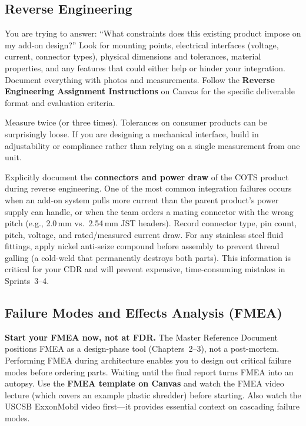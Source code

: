 \subsection{Reverse Engineering}

\begin{faqbox}
You are trying to answer: ``What constraints does this existing product impose on my add-on design?'' Look for mounting points, electrical interfaces (voltage, current, connector types), physical dimensions and tolerances, material properties, and any features that could either help or hinder your integration. Document everything with photos and measurements. Follow the \textbf{Reverse Engineering Assignment Instructions} on Canvas for the specific deliverable format and evaluation criteria.
\end{faqbox}

\begin{protip}
Measure twice (or three times). Tolerances on consumer products can be surprisingly loose. If you are designing a mechanical interface, build in adjustability or compliance rather than relying on a single measurement from one unit.
\end{protip}

\begin{warnbox}
Explicitly document the \textbf{connectors and power draw} of the COTS product during reverse engineering. One of the most common integration failures occurs when an add-on system pulls more current than the parent product's power supply can handle, or when the team orders a mating connector with the wrong pitch (e.g., 2.0\,mm vs.\ 2.54\,mm JST headers). Record connector type, pin count, pitch, voltage, and rated/measured current draw. For any stainless steel fluid fittings, apply nickel anti-seize compound before assembly to prevent thread galling (a cold-weld that permanently destroys both parts). This information is critical for your CDR and will prevent expensive, time-consuming mistakes in Sprints~3--4.
\end{warnbox}

\subsection{Failure Modes and Effects Analysis (FMEA)}

\begin{tipbox}
\textbf{Start your FMEA now, not at FDR.} The Master Reference Document positions FMEA as a design-phase tool (Chapters~2--3), not a post-mortem. Performing FMEA during architecture enables you to design out critical failure modes before ordering parts. Waiting until the final report turns FMEA into an autopsy. Use the \textbf{FMEA template on Canvas} and watch the FMEA video lecture (which covers an example plastic shredder) before starting. Also watch the USCSB ExxonMobil video first---it provides essential context on cascading failure modes.
\end{tipbox}

